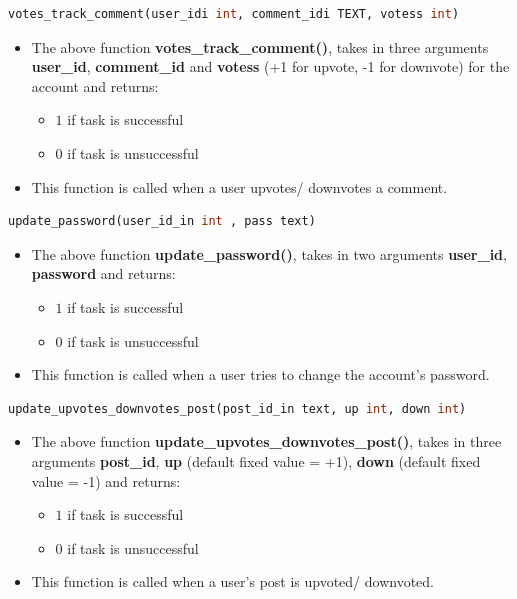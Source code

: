 \documentclass[12pt,a4paper]{article}
\begin{document}
	\begin{lstlisting}[language=SQL, style = mystyle]
	votes_track_comment(user_idi int, comment_idi TEXT, votess int)
\end{lstlisting}
\begin{itemize}
	\item The above function \textbf{votes\_track\_comment()}, takes in three arguments \textbf{user\_id}, \textbf{comment\_id} and \textbf{votess} (+1 for upvote, -1 for downvote) for the account and returns:
	\begin{itemize}
		\item $1$ if task is successful
		\item $0$ if task is unsuccessful
	\end{itemize}
	\item This function is called when a user upvotes/ downvotes a comment.
\end{itemize}
	
		\begin{lstlisting}[language=SQL, style = mystyle]
update_password(user_id_in int , pass text)
	\end{lstlisting}
	\begin{itemize}
		\item The above function \textbf{update\_password()}, takes in two arguments \textbf{user\_id}, \textbf{password} and returns:
		\begin{itemize}
			\item $1$ if task is successful
			\item $0$ if task is unsuccessful
		\end{itemize}
		\item This function is called when a user tries to change the account's password. 
	\end{itemize}

		\begin{lstlisting}[language=SQL, style = mystyle]
update_upvotes_downvotes_post(post_id_in text, up int, down int)
\end{lstlisting}
\begin{itemize}
	\item The above function \textbf{update\_upvotes\_downvotes\_post()}, takes in three arguments \textbf{post\_id}, \textbf{up} (default fixed value = +1), \textbf{down} (default fixed value = -1) and returns:
	\begin{itemize}
		\item $1$ if task is successful
		\item $0$ if task is unsuccessful
	\end{itemize}
	\item This function is called when a user's post is upvoted/ downvoted.
\end{itemize}
\end{document}
